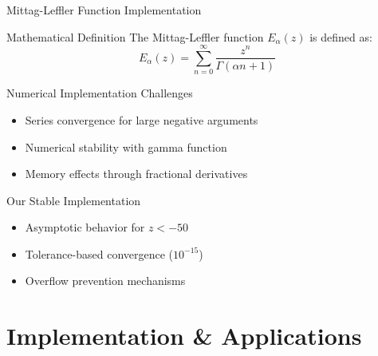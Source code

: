 \documentclass[aspectratio=169,14pt]{beamer}
\begin{document}
\begin{frame}{Mittag-Leffler Function Implementation}
    \begin{block}{Mathematical Definition}
        The Mittag-Leffler function $E_\alpha(z)$ is defined as:
        \[
        E_\alpha(z) = \sum_{n=0}^{\infty} \frac{z^n}{\Gamma(\alpha n + 1)}
        \]
    \end{block}
    
    \begin{block}{Numerical Implementation Challenges}
        \begin{itemize}
            \item Series convergence for large negative arguments
            \item Numerical stability with gamma function
            \item Memory effects through fractional derivatives
        \end{itemize}
    \end{block}
    
    \begin{block}{Our Stable Implementation}
        \begin{itemize}
            \item Asymptotic behavior for $z < -50$
            \item Tolerance-based convergence ($10^{-15}$)
            \item Overflow prevention mechanisms
        \end{itemize}
    \end{block}
\end{frame}

\section{Implementation \& Applications}
\end{document}
